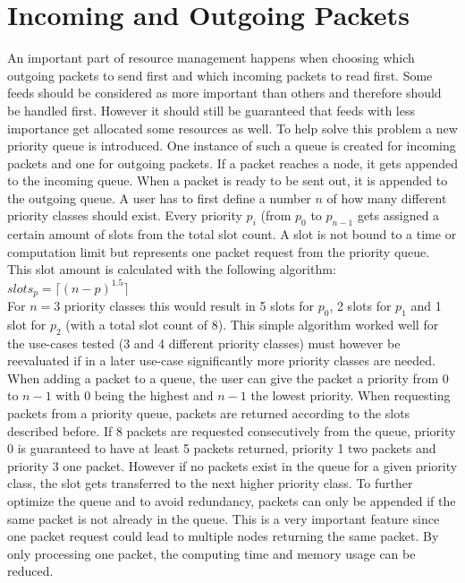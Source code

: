 \section{Incoming and Outgoing Packets}
\label{sec:io}
An important part of resource management happens when choosing which outgoing packets to send first and which incoming packets to read first. Some feeds should be considered as more important than others and therefore should be handled first. However it should still be guaranteed that feeds with less importance get allocated some resources as well. To help solve this problem a new priority queue is introduced. One instance of such a queue is created for incoming packets and one for outgoing packets. If a packet reaches a node, it gets appended to the incoming queue. When a packet is ready to be sent out, it is appended to the outgoing queue. A user has to first define a number $n$ of how many different priority classes should exist. Every priority $p_i$ (from $p_0$ to $p_{n - 1}$ gets assigned a certain amount of slots from the total slot count. A slot is not bound to a time or computation limit but represents one packet request from the priority queue. This slot amount is calculated with the following algorithm: \\ 
$slots_p = \lceil (n - p)^{1.5} \rceil$ \\
For $n = 3$ priority classes this would result in 5 slots for $p_0$, 2 slots for $p_1$ and 1 slot for $p_2$ (with a total slot count of 8). This simple algorithm worked well for the use-cases tested (3 and 4 different priority classes) must however be reevaluated if in a later use-case significantly more priority classes are needed. \\
When adding a packet to a queue, the user can give the packet a priority from 0 to $n - 1$ with 0 being the highest and $n-1$ the lowest priority. When requesting packets from a priority queue, packets are returned according to the slots described before. If 8 packets are requested consecutively from the queue, priority 0 is guaranteed to have at least 5 packets returned, priority 1 two packets and priority 3 one packet. However if no packets exist in the queue for a given priority class, the slot gets transferred to the next higher priority class. To further optimize the queue and to avoid redundancy, packets can only be appended if the same packet is not already in the queue. This is a very important feature since one packet request could lead to multiple nodes returning the same packet. By only processing one packet, the computing time and memory usage can be reduced.

